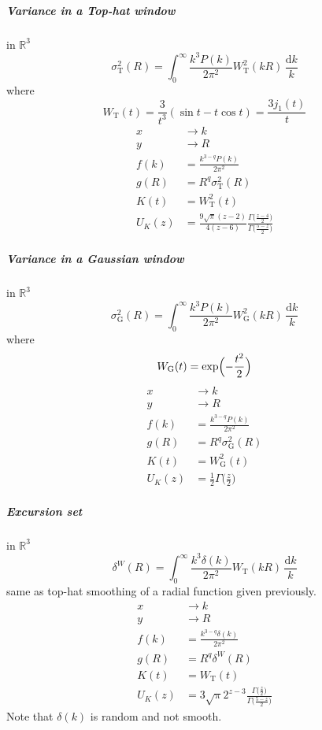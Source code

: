 \documentclass{article}
\renewcommand{\d}{\mathrm{d}}
\newcommand{\Mellin}{U}
\newcommand{\Tophat}{\mathrm{T}}
\newcommand{\Gauss}{\mathrm{G}}
\begin{document}
\subparagraph{Variance in a Top-hat window}
in $\mathbb{R}^3$
\begin{equation}
    \sigma_\Tophat^2(R) = \int_0^\infty \frac{k^3P(k)}{2\pi^2} W_\Tophat^2(kR) \,\frac{\d k}k
\end{equation}
where
\begin{equation}
    W_\Tophat(t) = \frac3{t^3}(\sin t - t\cos t) = \frac{3j_1(t)}t
\end{equation}
\begin{align}
    x &\to k \\
    y &\to R \\
    f(k) &= \frac{k^{3-q}P(k)}{2\pi^2} \\
    g(R) &= R^q \sigma_\Tophat^2(R) \\
    K(t) &= W_\Tophat^2(t) \\
    \Mellin_K(z) &= \frac{9\sqrt{\pi}(z-2)}{4(z-6)}
        \frac{\Gamma\bigl(\frac{z-4}2\bigr)}{\Gamma\bigl(\frac{5-z}2\bigr)}
\end{align}


\subparagraph{Variance in a Gaussian window}
in $\mathbb{R}^3$
\begin{equation}
    \sigma_\Gauss^2(R) = \int_0^\infty \frac{k^3P(k)}{2\pi^2} W_\Gauss^2(kR) \,\frac{\d k}k
\end{equation}
where
\begin{equation}
    W_\Gauss(t) = \exp\Bigl(-\frac{t^2}2\Bigr)
\end{equation}
\begin{align}
    x &\to k \\
    y &\to R \\
    f(k) &= \frac{k^{3-q}P(k)}{2\pi^2} \\
    g(R) &= R^q \sigma_\Gauss^2(R) \\
    K(t) &= W_\Gauss^2(t) \\
    \Mellin_K(z) &= \frac12 \Gamma\bigl(\frac{z}2\bigr)
\end{align}


\subparagraph{Excursion set}
in $\mathbb{R}^3$
\begin{equation}
    \delta^W(R) = \int_0^\infty \frac{k^3\delta(k)}{2\pi^2} W_\Tophat(kR) \,\frac{\d k}k
\end{equation}
same as top-hat smoothing of a radial function given previously.
\begin{align}
    x &\to k \\
    y &\to R \\
    f(k) &= \frac{k^{3-q}\delta(k)}{2\pi^2} \\
    g(R) &= R^q \delta^W(R) \\
    K(t) &= W_\Tophat(t) \\
    \Mellin_K(z) &= 3\sqrt\pi 2^{z-3}
            \frac{\Gamma\bigl(\frac{z}2\bigr)}{\Gamma\bigl(\frac{5-z}2\bigr)}
\end{align}
Note that $\delta(k)$ is random and not smooth.
\end{document}
